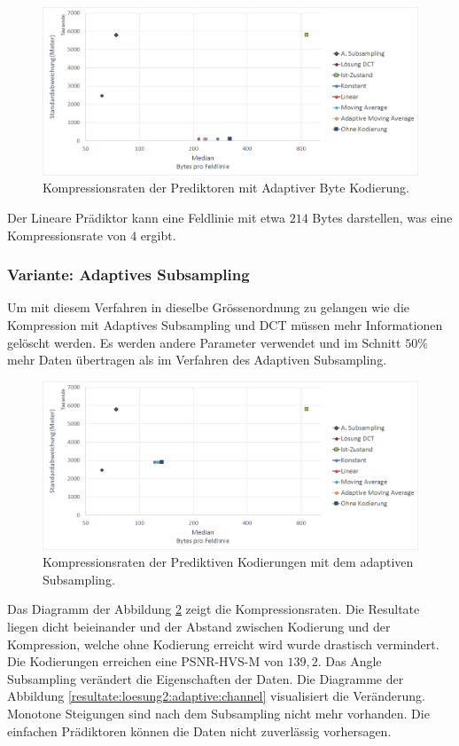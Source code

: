 \begin{figure}[!htbp]
	\center
	\includegraphics[width=1\textwidth,keepaspectratio]{./pictures/resultate/loesung2/variante0/resultate_byte.png}
	\caption{Kompressionsraten der Prediktoren mit Adaptiver Byte Kodierung.}
	\label{resultate:loesung2:simple:resultate_byte}
\end{figure}
Der Lineare Prädiktor kann eine Feldlinie mit etwa $214$ Bytes darstellen, was eine Kompressionsrate von $4$ ergibt.

\subsubsection{Variante: Adaptives Subsampling} \label{resultate:loesung2:adaptive}
Um mit diesem Verfahren in dieselbe Grössenordnung zu gelangen wie die Kompression mit Adaptives Subsampling und DCT müssen mehr Informationen gelöscht werden. Es werden andere Parameter verwendet und im Schnitt $50\%$ mehr Daten übertragen als im Verfahren des Adaptiven Subsampling.

\begin{figure}[!htbp]
	\center
	\includegraphics[width=1\textwidth,keepaspectratio]{./pictures/resultate/loesung2/variante1/resultate_euler.png}
	\caption{Kompressionsraten der Prediktiven Kodierungen mit dem adaptiven Subsampling.}
	\label{resultate:loesung2:adaptive:euler}
\end{figure}
Das Diagramm der Abbildung \ref{resultate:loesung2:adaptive:euler} zeigt die Kompressionsraten. Die Resultate liegen dicht beieinander und der Abstand zwischen Kodierung und der Kompression, welche ohne Kodierung erreicht wird wurde drastisch vermindert. Die Kodierungen erreichen eine PSNR-HVS-M von $139,2$. Das Angle Subsampling verändert die Eigenschaften der Daten. Die Diagramme der Abbildung \ref{resultate:loesung2:adaptive:channel} visualisiert die Veränderung. Monotone Steigungen sind nach dem Subsampling nicht mehr vorhanden. Die einfachen Prädiktoren können die Daten nicht zuverlässig vorhersagen.

